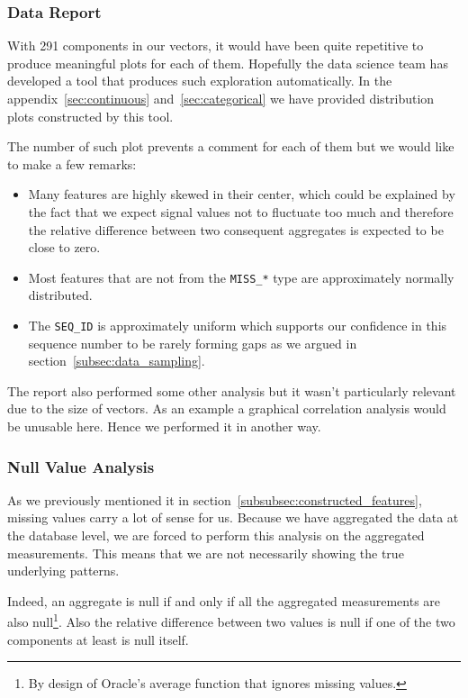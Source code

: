 \subsubsection{Data Report}
With 291 components in our vectors, it would have been quite repetitive to produce meaningful plots for each of them. Hopefully the data science team has developed a tool that produces such exploration automatically. In the appendix~\ref{sec:continuous} and~\ref{sec:categorical} we have provided distribution plots constructed by this tool. 

The number of such plot prevents a comment for each of them but we would like to make a few remarks:
\begin{itemize}[noitemsep,topsep=0pt]
	\item Many features are highly skewed in their center, which could be explained by the fact that we expect signal values not to fluctuate too much and therefore the relative difference between two consequent aggregates is expected to be close to zero.
	\item Most features that are not from the \texttt{MISS\_*} type are approximately normally distributed. 
	\item The \texttt{SEQ\_ID} is approximately uniform which supports our confidence in this sequence number to be rarely forming gaps as we argued in section~\ref{subsec:data_sampling}.
\end{itemize}

The report also performed some other analysis but it wasn't particularly relevant due to the size of vectors. As an example a graphical correlation analysis would be unusable here. Hence we performed it in another way. 

\subsubsection{Null Value Analysis}
As we previously mentioned it in section~\ref{subsubsec:constructed_features}, missing values carry a lot of sense for us. Because we have aggregated the data at the database level, we are forced to perform this analysis on the aggregated measurements. This means that we are not necessarily showing the true underlying patterns. 

Indeed, an aggregate is null if and only if all the aggregated measurements are also null\footnote{By design of Oracle's average function that ignores missing values.}. Also the relative difference between two values is null if one of the two components at least is null itself. 

